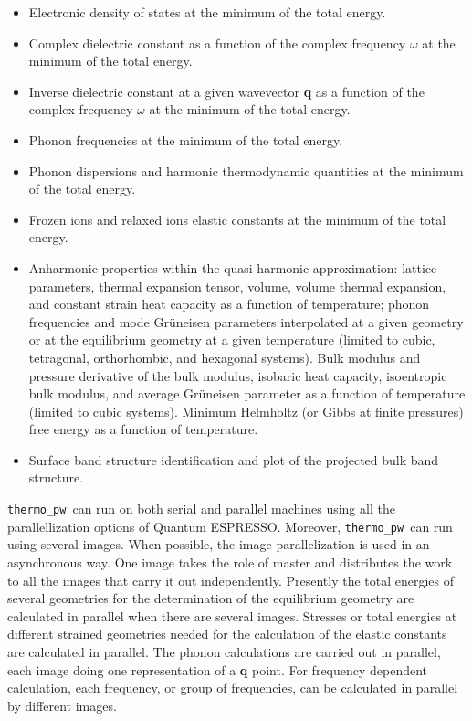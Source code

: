 \documentclass[12pt,a4paper]{article}
\def\qe{{\sc Quantum ESPRESSO}}
\def\thermo{\texttt{thermo\_pw}}
\begin{document}
\begin{itemize}
\item Electronic density of states at the minimum of the total energy.

\item Complex dielectric constant as a function of the complex
frequency $\omega$ at the minimum of the total energy.

\item Inverse dielectric constant at a given wavevector {\bf q} as a function 
of the complex frequency $\omega$ at the minimum of the total energy.

\item Phonon frequencies at the minimum of the total energy.

\item Phonon dispersions and harmonic thermodynamic quantities
at the minimum of the total energy.

\item Frozen ions and relaxed ions elastic constants at the minimum of the total
energy.

\item Anharmonic properties within the quasi-harmonic approximation: 
lattice parameters, thermal expansion tensor, volume, volume thermal 
expansion, and constant strain heat capacity as a function of temperature; 
phonon frequencies and mode Gr\"uneisen parameters interpolated at a given
geometry or at the equilibrium geometry at a given temperature
(limited to cubic, tetragonal, orthorhombic, and hexagonal systems).
Bulk modulus and pressure derivative of the bulk modulus, isobaric heat 
capacity, isoentropic bulk modulus, and average Gr\"uneisen parameter as 
a function of temperature (limited to cubic systems).
Minimum Helmholtz (or Gibbs at finite pressures) free energy 
as a function of temperature.

\item Surface band structure identification and plot of the projected bulk
band structure.

\end{itemize}

\thermo\ can run on both serial and parallel machines using all 
the parallellization options of \qe. Moreover, \thermo\ can run using 
several images.
When possible, the image parallelization is used in an asynchronous way.
One image takes the role of master and distributes the work 
to all the images that carry it out independently. Presently 
the total energies of several geometries for the determination of the 
equilibrium geometry are calculated in parallel when
there are several images. Stresses or total energies at different strained 
geometries needed for the calculation of the elastic constants are 
calculated in parallel. 
The phonon calculations are carried out in parallel, each image doing one 
representation of a {\bf q} point. For frequency dependent calculation,
each frequency, or group of frequencies, can be calculated in parallel
by different images.
\end{document}
